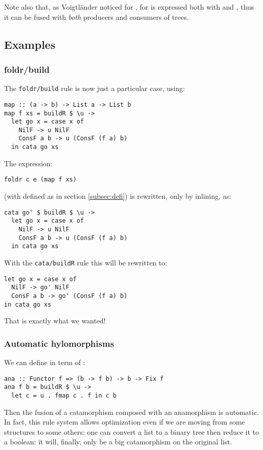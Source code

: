 Note also that, as Voigtländer \cite{Voigtlnder2008TypesFP} noticed for ,  for  is expressed both with  and , thus it can be fused with \emph{both} producers and consumers of trees.

\subsection{Examples}
\subsubsection{foldr/build}
The \verb|foldr/build| rule is now just a particular case, using:
\begin{verbatim}
map :: (a -> b) -> List a -> List b
map f xs = buildR $ \u ->
  let go x = case x of
    NilF -> u NilF
    ConsF a b -> u (ConsF (f a) b)
  in cata go xs
\end{verbatim}

\noindent The expression:
\begin{verbatim}
foldr c e (map f xs)
\end{verbatim}
(with  defined as in section \ref{subsec:defi}) is rewritten, only by inlining, as:
\begin{verbatim}
cata go' $ buildR $ \u ->
  let go x = case x of
    NilF -> u NilF
    ConsF a b -> u (ConsF (f a) b)
  in cata go xs
\end{verbatim}

\noindent With the \verb|cata/buildR| rule this will be rewritten to:
\begin{verbatim}
let go x = case x of
  NilF -> go' NilF
  ConsF a b -> go' (ConsF (f a) b)
in cata go xs
\end{verbatim}
That is exactly what we wanted!

\subsubsection{Automatic hylomorphisms}
We can define  in term of :
\begin{verbatim}
ana :: Functor f => (b -> f b) -> b -> Fix f
ana f b = buildR $ \u ->
  let c = u . fmap c . f in c b
\end{verbatim}

\noindent Then the fusion of a catamorphism composed with an anamorphism is automatic. In fact, this rule system allows optimization even if we are moving from some structures to some others: one can convert a list to a binary tree then reduce it to a boolean: it will, finally, only be a big catamorphism on the original list.

